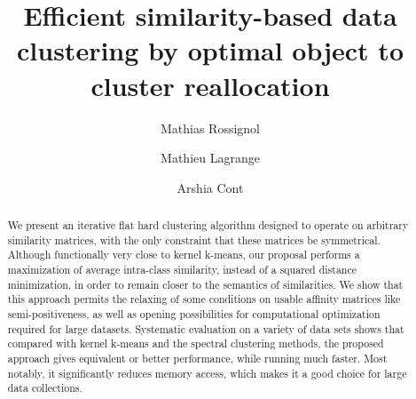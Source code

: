 \documentclass[natbib,smallextended]{svjour3}
\begin{document}
\title{Efficient similarity-based data clustering by optimal object to cluster reallocation}

\author{ Mathias Rossignol      \and
        Mathieu Lagrange  \and
        Arshia Cont
}
\authorrunning{} %


%
%




\maketitle


\begin{abstract}%
We present an iterative flat hard clustering algorithm designed to operate on arbitrary similarity matrices, with the only constraint that these matrices be symmetrical. Although functionally very close to kernel k-means, our proposal performs a maximization of average intra-class similarity, instead of a squared distance minimization, in order to remain closer to the semantics of similarities. We show that this approach permits the relaxing of some conditions on usable affinity matrices like semi-positiveness, as well as opening possibilities for computational optimization required for large datasets. Systematic evaluation on a variety of data sets shows that compared with kernel k-means and the spectral clustering methods, the proposed approach gives equivalent or better performance, while running much faster. Most notably, it significantly reduces memory access, which makes it a good choice for large data collections.
\end{abstract}
\end{document}
